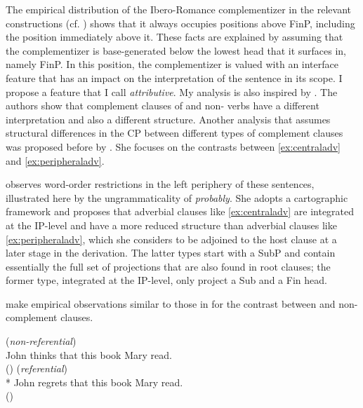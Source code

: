 The empirical distribution of the Ibero-Romance complementizer in the relevant constructions (cf. ) shows that it always occupies positions above FinP, including the position immediately above it. These  facts are explained  by assuming that the complementizer is base-generated  below the lowest head that it  surfaces in, namely FinP.  
In this position, the complementizer is valued with an interface feature that has an impact on the interpretation of the sentence in its scope. I propose  a feature that I call \emph{attributive}. My analysis is also inspired by \citet{Cuba2013}. The authors show that complement clauses of  and non- verbs have a different interpretation and also a different structure. Another  analysis that assumes structural differences in the CP between different types of complement clauses  was  proposed before \citet{Cuba2013} by  \citet{Haegeman2004, Haegeman2006}. She focuses on the contrasts between \eqref{ex:centraladv} and \eqref{ex:peripheraladv}.\largerpage

\z

\citet{Haegeman2006} observes word-order restrictions in the left periphery of these sentences, illustrated here by the ungrammaticality of \emph{probably}. She adopts a cartographic framework and proposes that adverbial clauses like \eqref{ex:centraladv} are integrated at the IP-level and have a more reduced structure than adverbial clauses like \eqref{ex:peripheraladv}, which she considers to be adjoined to the host clause at a later stage in the derivation.  The latter types start with a SubP and contain essentially the full set of projections that are also found in root clauses; the former type, integrated at the IP-level,  only project a Sub and a Fin head.


 make  empirical observations similar to those in \citet{Haegeman2004,Haegeman2006} for the contrast between  and non- complement clauses.


\ea \label{ex:thinkregret}
\ea(\textit{non-referential}) \\ John thinks that this book Mary read. \\(\citealt[8: ex 10a]{Cuba2013})\label{ex:think}
		\ex (\textit{referential})  \\ * John regrets that this book Mary read. \\ (\citealt[8: ex 9a]{Cuba2013})\label{ex:regret} 
	\z
\z


